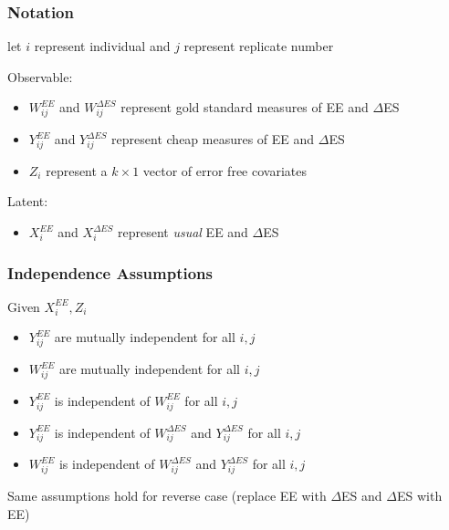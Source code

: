 \documentclass[handout]{beamer}\usepackage[]{graphicx}\usepackage[]{color}
\begin{document}
\begin{frame}
\frametitle{Notation}
let $i$ represent individual and $j$ represent replicate number \\

\vspace{0.3cm}

Observable:
\begin{itemize}
\item
$W_{ij}^{EE}$ and $W_{ij}^{\Delta ES}$ represent gold standard measures of EE and $\Delta$ES
\item
$Y_{ij}^{EE}$ and $Y_{ij}^{\Delta ES}$ represent cheap measures of EE and $\Delta$ES
\item
$Z_i$ represent a $k\times 1$ vector of error free covariates
\end{itemize}

\vspace{0.2cm}

Latent:
\begin{itemize}
\item
$X_{i}^{EE}$ and $X_{i}^{\Delta ES}$ represent \emph{usual} EE and $\Delta$ES

\end{itemize}

\end{frame}


\begin{frame}
\frametitle{Independence Assumptions}
Given $X_i^{EE}, Z_i$

\begin{itemize}
\item
$Y^{EE}_{ij}$ are mutually independent for all $i,j$ \\
\item
$W_{ij}^{EE}$ are mutually independent for all $i,j$ \\
\item
$Y_{ij}^{EE}$ is independent of $W_{ij}^{EE}$ for all $i,j$ \\
\item
$Y_{ij}^{EE}$ is independent of $W_{ij}^{\Delta ES}$ and $Y_{ij}^{\Delta ES}$ for all $i,j$ \\
\item
$W_{ij}^{EE}$ is independent of $W_{ij}^{\Delta ES}$ and $Y_{ij}^{\Delta ES}$ for all $i,j$ \\
\end{itemize}

\vspace{0.2cm}

Same assumptions hold for reverse case (replace EE with $\Delta$ES and $\Delta$ES with EE)


\end{frame}
\end{document}
